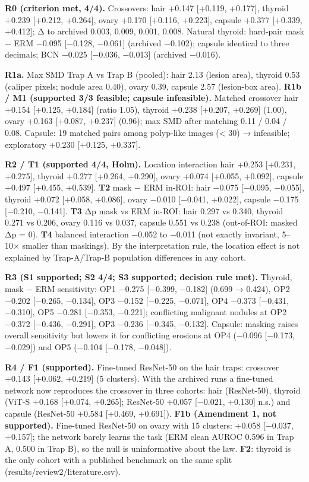 {\textbf{R0 (criterion met, 4/4).} Crossovers: hair +0.147 {[}+0.119, +0.177{]}, thyroid +0.239 {[}+0.212, +0.264{]}, ovary +0.170
{[}+0.116, +0.223{]}, capsule +0.377 {[}+0.339, +0.412{]}; \textbar Δ\textbar{} to archived 0.003, 0.009, 0.001, 0.008. Natural thyroid:
hard-pair mask − ERM −0.095 {[}−0.128, −0.061{]} (archived −0.102); capsule identical to three decimals; BCN −0.025
{[}−0.036, −0.013{]} (archived −0.016).

\textbf{R1a.} Max \textbar SMD\textbar{} Trap A vs Trap B (pooled): hair 2.13 (lesion area), thyroid 0.53 (caliper pixels; nodule area
0.40), ovary 0.39, capsule 2.57 (lesion-box area). \textbf{R1b / M1 (supported 3/3 feasible; capsule infeasible).} Matched
crossover hair +0.154 {[}+0.125, +0.184{]} (ratio 1.05), thyroid +0.238 {[}+0.207, +0.269{]} (1.00), ovary +0.163
{[}+0.087, +0.237{]} (0.96); max \textbar SMD\textbar{} after matching 0.11 / 0.04 / 0.08. Capsule: 19 matched pairs among polyp-like
images (\textless{} 30) → infeasible; exploratory +0.230 {[}+0.125, +0.337{]}.

\textbf{R2 / T1 (supported 4/4, Holm).} Location interaction hair +0.253 {[}+0.231, +0.275{]}, thyroid +0.277
{[}+0.264, +0.290{]}, ovary +0.074 {[}+0.055, +0.092{]}, capsule +0.497 {[}+0.455, +0.539{]}. \textbf{T2} mask − ERM in-ROI: hair −0.075
{[}−0.095, −0.055{]}, thyroid +0.072 {[}+0.058, +0.086{]}, ovary −0.010 {[}−0.041, +0.022{]}, capsule −0.175 {[}−0.210, −0.141{]}.
\textbf{T3} \textbar Δp\textbar{} mask vs ERM in-ROI: hair 0.297 vs 0.340, thyroid 0.271 vs 0.206, ovary 0.116 vs 0.037, capsule 0.551 vs
0.238 (out-of-ROI: masked \textbar Δp\textbar{} = 0). \textbf{T4} balanced interaction −0.052 to −0.011 (not exactly invariant, 5--10× smaller
than masking\textquotesingle s). By the interpretation rule, the location effect is not explained by Trap-A/Trap-B population
differences in any cohort.

\textbf{R3 (S1 supported; S2 4/4; S3 supported; decision rule met).} Thyroid, mask − ERM sensitivity: OP1 −0.275
{[}−0.399, −0.182{]} (0.699 → 0.424), OP2 −0.202 {[}−0.265, −0.134{]}, OP3 −0.152 {[}−0.225, −0.071{]}, OP4 −0.373
{[}−0.431, −0.310{]}, OP5 −0.281 {[}−0.353, −0.221{]}; conflicting malignant nodules at OP2 −0.372 {[}−0.436, −0.291{]}, OP3 −0.236
{[}−0.345, −0.132{]}. Capsule: masking raises overall sensitivity but lowers it for conflicting erosions at OP4 (−0.096
{[}−0.173, −0.029{]}) and OP5 (−0.104 {[}−0.178, −0.048{]}).

\textbf{R4 / F1 (supported).} Fine-tuned ResNet-50 on the hair traps: crossover +0.143 {[}+0.062, +0.219{]} (5 clusters).
With the archived runs a fine-tuned network now reproduces the crossover in three cohorts: hair (ResNet-50), thyroid
(ViT-S +0.168 {[}+0.074, +0.265{]}; ResNet-50 +0.057 {[}−0.021, +0.130{]} n.s.) and capsule (ResNet-50 +0.584 {[}+0.469, +0.691{]}).
\textbf{F1b (Amendment 1, not supported).} Fine-tuned ResNet-50 on ovary with 15 clusters: +0.058 {[}−0.037, +0.157{]}; the
network barely learns the task (ERM clean AUROC 0.596 in Trap A, 0.500 in Trap B), so the null is uninformative about
the law. \textbf{F2}: thyroid is the only cohort with a published benchmark on the same split (results/review2/literature.csv).

}

